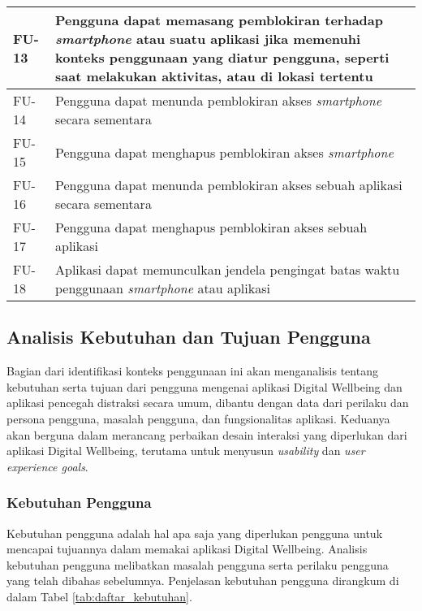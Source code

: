 \begin{footnotesize}
\begin{longtable}[c]{|W{c}{0.08\textwidth}|>{\ccnormspacing}m{0.82\textwidth}|}
  FU-13  &  Pengguna dapat memasang pemblokiran terhadap \textit{smartphone} atau suatu aplikasi jika memenuhi konteks penggunaan yang diatur pengguna, seperti saat melakukan aktivitas, atau di lokasi tertentu \\ \hline
  FU-14  &  Pengguna dapat menunda pemblokiran akses \textit{smartphone} secara sementara \\ \hline
  FU-15  &  Pengguna dapat menghapus pemblokiran akses \textit{smartphone}\\ \hline
  FU-16  &  Pengguna dapat menunda pemblokiran akses sebuah aplikasi secara sementara \\ \hline
  FU-17  &  Pengguna dapat menghapus pemblokiran akses sebuah aplikasi \\ \hline
  FU-18  &  Aplikasi dapat memunculkan jendela pengingat batas waktu penggunaan \textit{smartphone} atau aplikasi \\ \hline
  
  
\end{longtable}
\end{footnotesize}
\justifying
\FloatBarrier

\subsection{Analisis Kebutuhan dan Tujuan Pengguna}
\label{subsec:analisis_kebutuhan_tujuan}

Bagian dari identifikasi konteks penggunaan ini akan menganalisis tentang kebutuhan serta tujuan dari pengguna mengenai aplikasi Digital Wellbeing dan aplikasi pencegah distraksi secara umum, dibantu dengan data dari perilaku dan persona pengguna, masalah pengguna, dan fungsionalitas aplikasi. Keduanya akan berguna dalam merancang perbaikan desain interaksi yang diperlukan dari aplikasi Digital Wellbeing, terutama untuk menyusun \textit{usability} dan \textit{user experience goals}.

\subsubsection{Kebutuhan Pengguna}
\label{subsubsec:kebutuhan_pengguna}

Kebutuhan pengguna adalah hal apa saja yang diperlukan pengguna untuk mencapai tujuannya dalam memakai aplikasi Digital Wellbeing. Analisis kebutuhan pengguna melibatkan masalah pengguna serta perilaku pengguna yang telah dibahas sebelumnya. Penjelasan kebutuhan pengguna dirangkum di dalam Tabel \ref{tab:daftar_kebutuhan}.

